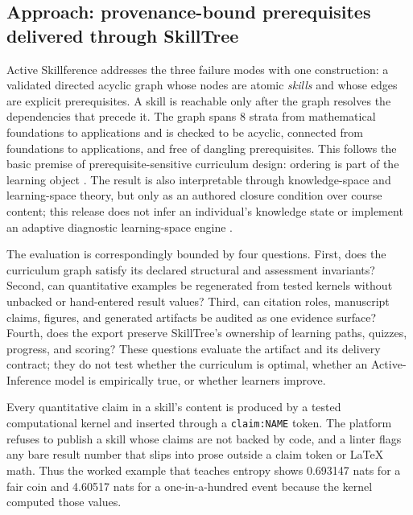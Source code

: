\documentclass[
  english,
]{article}
\begin{document}
\subsection{Approach: provenance-bound prerequisites delivered through
SkillTree}\label{approach-provenance-bound-prerequisites-delivered-through-skilltree}

Active Skillference addresses the three failure modes with one
construction: a validated directed acyclic graph whose nodes are atomic
\emph{skills} and whose edges are explicit prerequisites. A skill is
reachable only after the graph resolves the dependencies that precede
it. The graph spans 8 strata from mathematical foundations to
applications and is checked to be acyclic, connected from foundations to
applications, and free of dangling prerequisites. This follows the basic
premise of prerequisite-sensitive curriculum design: ordering is part of
the learning object \citep{bloom1956taxonomy, liang2018prerequisite}.
The result is also interpretable through knowledge-space and
learning-space theory, but only as an authored closure condition over
course content; this release does not infer an individual's knowledge
state or implement an adaptive diagnostic learning-space engine
\citep{doignon1985knowledge_spaces, falmagne2011learning_spaces}.

The evaluation is correspondingly bounded by four questions. First, does
the curriculum graph satisfy its declared structural and assessment
invariants? Second, can quantitative examples be regenerated from tested
kernels without unbacked or hand-entered result values? Third, can
citation roles, manuscript claims, figures, and generated artifacts be
audited as one evidence surface? Fourth, does the export preserve
SkillTree's ownership of learning paths, quizzes, progress, and scoring?
These questions evaluate the artifact and its delivery contract; they do
not test whether the curriculum is optimal, whether an Active-Inference
model is empirically true, or whether learners improve.

Every quantitative claim in a skill's content is produced by a tested
computational kernel and inserted through a \texttt{claim:NAME} token.
The platform refuses to publish a skill whose claims are not backed by
code, and a linter flags any bare result number that slips into prose
outside a claim token or LaTeX math. Thus the worked example that
teaches entropy shows 0.693147 nats for a fair coin and 4.60517 nats for
a one-in-a-hundred event because the kernel computed those values.
\end{document}
